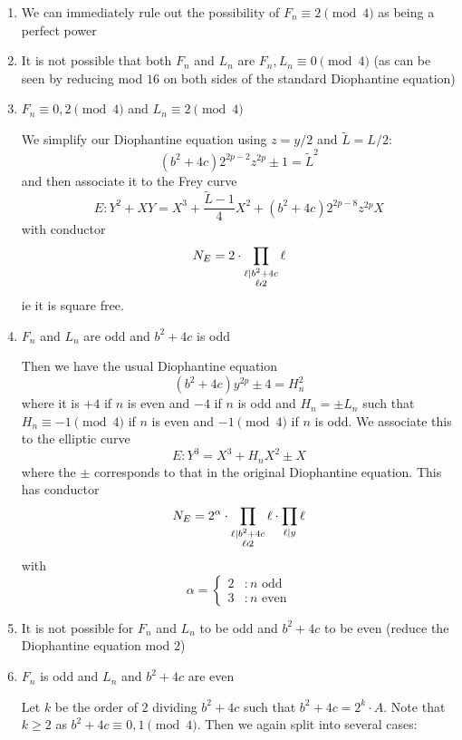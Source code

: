 \documentclass[12pt]{article}
\newcommand{\notdiv}{\nshortmid}
\begin{document}
\begin{enumerate}


\item We can immediately rule out the possibility of $F_n \equiv 2 \pmod{4}$ as being a perfect power

\item It is not possible that both $F_n$ and $L_n$ are $F_n, L_n \equiv 0 \pmod{4}$ (as can be seen by reducing mod $16$ on both sides of the standard Diophantine equation)

\item $F_n \equiv 0,2 \pmod{4}$ and $L_n \equiv 2 \pmod{4}$

We simplify our Diophantine equation using $z = y/2$ and $\tilde{L} = L/2$:
\[ (b^2+4c) 2^{2p-2} z^{2p} \pm 1 = \tilde{L}^2 \]
and then associate it to the Frey curve
\[E: Y^2 +XY = X^3 + \frac{\tilde{L} -1}{4} X^2  + (b^2+4c) 2^{2p-8} z^{2p}X \]
with conductor
\[N_E = 2 \cdot \prod_{\substack{\ell | b^2+4c \\ \ell \notdiv 2}} \ell \]
ie it is square free.

\item $F_n$ and $L_n$ are odd and $b^2+4c$ is odd

Then we have the usual Diophantine equation 
\[ (b^2+4c)y^{2p} \pm 4 = H_n^2 \]
where it is $+4$ if $n$ is even and $-4$ if $n$ is odd and $H_n = \pm L_n$ such that $H_n \equiv -1\pmod{4}$ if $n$ is even and $-1 \pmod{4}$ if $n$ is odd.
We associate this to the elliptic curve
\[ E: Y^3 = X^3 + H_n X^2 \pm X \]
where the $\pm$ corresponds to that in the original Diophantine equation.  This has conductor
\[N_E = 2^{\alpha} \cdot  \prod_{\substack{\ell | b^2+4c \\ \ell \notdiv 2}} \ell \cdot \prod_{\ell | y} \ell \]
with 
\[ \alpha = \begin{cases} 2 &: n \text{ odd} \\ 3 &:  n \text{ even} \end{cases} \]

\item It is not possible for $F_n$ and $L_n$ to be odd and $b^2+4c$ to be even (reduce the Diophantine equation mod $2$)

\item $F_n$ is odd and $L_n$ and $b^2+4c$ are even

Let $k$ be the order of $2$ dividing $b^2+4c$ such that $b^2 + 4c = 2^k \cdot A$.  Note that $k \geq 2$ as $b^2 + 4c \equiv 0,1 \pmod{4}$.  Then we again split into several cases:


\end{enumerate}
\end{document}
